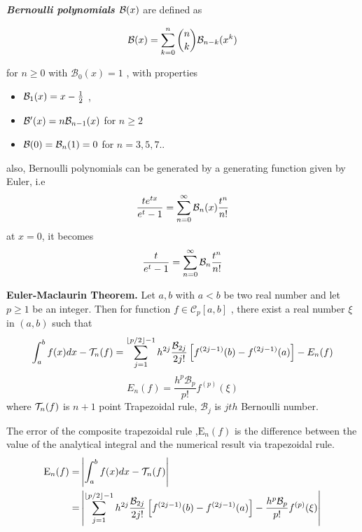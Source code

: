 \documentclass[../document.tex]{subfiles}
\begin{document}
	
	\begin{simp_num}\textbf{\emph{Bernoulli polynomials $\mathcal{B}(x)$}} are defined as
		
		\begin{equation}
			\mathcal{B}(x) = 
			\sum_{k=0}^{n}  \binom{n}{k} \mathcal{B}_{n-k} (x^k)
		\end{equation}
		
		for $n\geqslant0$ with $\mathcal{B}_0(x) =1$ , with properties
		
		\begin{itemize}
			\item $\mathcal{B}_1(x) =x - \frac{1}{2}$  ,  
			
			\item $\mathcal{B}'(x) =n\mathcal{B}_{n-1}(x) $  for $n \geqslant 2$
			
			\item $\mathcal{B}(0) =\mathcal{B}_n(1) = 0 $ for $n = 3,5,7 ..$
		\end{itemize}
		
		also, Bernoulli polynomials can be generated by a generating function given by Euler, i.e
		$$
		\frac{te^{tx}}{e^t -1} = \sum^{\infty}_{n=0} \mathcal{B}_n(x) \frac{t^n}{n!}
		$$
		at $x=0$, it becomes 
		$$
		\frac{t}{e^t -1} = \sum^{\infty}_{n=0} \mathcal{B}_n \frac{t^n}{n!}
		$$
	\end{simp_num}
	
	\begin{simp_num}{\normalfont\textbf{Euler-Maclaurin Theorem.}}
		Let $a,b$ with $a<b$ be two real number and let $p\geq1$ be an integer. Then for function $f \in \mathcal{C}_p[a,b]$ ,
		there exist a real number $\xi$ in $(a,b)$ such that
		\begin{equation} \label{euler_macl}
			\int_a^b f(x)dx - \mathcal{T}_n(f) = 
			\sum_{j=1}^{ \lfloor p/2\rfloor -1 }  h^{2j} \frac{\mathcal{B}_{2j}}{2j!}
			\left[
			f^{(2j-1)}(b) - f^{(2j-1)}(a) 
			\right] -  E_n(f) 
		\end{equation}
		$$
		E_n(f) = \frac{h^p  \mathcal{B}_p  }{p!}  f^{ (p)} (\xi)
		$$
		where $\mathcal{T}_n(f)$ is $n+1$ point Trapezoidal rule, $\mathcal{B}_j$ is $jth$ Bernoulli number.
	\end{simp_num}
	
	
	The error of the composite trapezoidal rule ,$ \mathrm{E}_n(f) $ is the difference between the value of the analytical integral and the numerical result via trapezoidal rule.
	\begin{equation*}
		\begin{split}
			\mathrm{E}_n(f) =& \left| \int_a^b f(x)dx - \mathcal{T}_n (f) \right|
			\\
			=& \left| \sum_{j=1}^{ \lfloor p/2\rfloor -1 }  h^{2j} \frac{\mathcal{B}_{2j}}{2j!}
			\left[
			f^{(2j-1)}(b) - f^{(2j-1)}(a) 
			\right] -  \frac{h^p  \mathcal{B}_p  }{p!}  f^{ (p)} (\xi) \right| 
		\end{split}
	\end{equation*}
	
\end{document}
